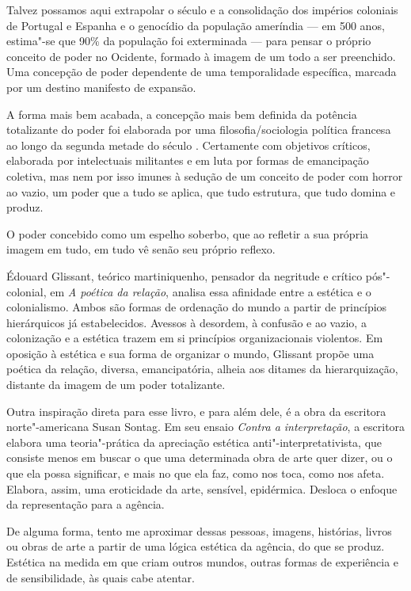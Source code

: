 Talvez possamos aqui extrapolar o século  e a consolidação dos
impérios coloniais de Portugal e Espanha e o genocídio da população
ameríndia --- em 500 anos, estima"-se que 90\% da população foi exterminada
--- para pensar o próprio conceito de poder no Ocidente, formado à imagem
de um todo a ser preenchido. Uma concepção de poder dependente de uma
temporalidade específica, marcada por um destino manifesto de expansão.

A forma mais bem acabada, a concepção mais bem definida da potência
totalizante do poder foi elaborada por uma filosofia/sociologia
política francesa ao longo da segunda metade do século . Certamente
com objetivos críticos, elaborada por intelectuais militantes e em luta
por formas de emancipação coletiva, mas nem por isso imunes à sedução de
um conceito de poder com horror ao vazio, um poder que a tudo se aplica,
que tudo estrutura, que tudo domina e produz.

O poder concebido como um espelho soberbo, que ao refletir a sua própria
imagem em tudo, em tudo vê senão seu próprio reflexo.

\asterisc

Édouard Glissant, teórico martiniquenho, pensador da negritude e crítico
pós"-colonial, em \emph{A poética da relação}, analisa essa afinidade
entre a estética e o colonialismo. Ambos são formas de ordenação do
mundo a partir de princípios hierárquicos já estabelecidos. Avessos à
desordem, à confusão e ao vazio, a colonização e a estética trazem em si
princípios organizacionais violentos. Em oposição à estética e sua forma
de organizar o mundo, Glissant propõe uma poética da relação, diversa,
emancipatória, alheia aos ditames da hierarquização, distante da imagem
de um poder totalizante.

\asterisc

Outra inspiração direta para esse livro, e para além dele, é a obra da
escritora norte"-americana Susan Sontag. Em seu ensaio \emph{Contra a
interpretação}, a escritora elabora uma teoria"-prática da apreciação estética
anti"-interpretativista, que consiste menos em buscar o que uma
determinada obra de arte quer dizer, ou o que ela possa significar, e
mais no que ela faz, como nos toca, como nos afeta. Elabora, assim, uma
eroticidade da arte, sensível, epidérmica. Desloca o enfoque da
representação para a agência.

De alguma forma, tento me aproximar dessas pessoas, imagens, histórias,
livros ou obras de arte a partir de uma lógica estética da agência, do
que se produz. Estética na medida em que criam outros mundos, outras
formas de experiência e de sensibilidade, às quais cabe atentar.

